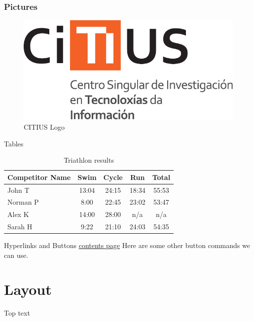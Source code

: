 \documentclass[aspectratio=169]{beamer}
\begin{document}
\begin{frame}
\frametitle{Pictures}
\begin{figure}
\includegraphics[scale=0.5]{img/logo_CiTIUS}
\caption{CITIUS Logo}
\end{figure}
\end{frame}

\begin{frame}{Tables}
\begin{table}
\begin{tabular}{l | c | c | c | c }
Competitor Name & Swim & Cycle & Run & Total \\
\hline \hline
John T & 13:04 & 24:15 & 18:34 & 55:53 \\ 
Norman P & 8:00 & 22:45 & 23:02 & 53:47\\
Alex K & 14:00 & 28:00 & n/a & n/a\\
Sarah H & 9:22 & 21:10 & 24:03 & 54:35 
\end{tabular}
\caption{Triathlon results}
\end{table}
\end{frame}

\begin{frame}{Hyperlinks and Buttons}
\hyperlink{contents}{contents page}
Here are some other button commands we can use.

\hyperlink{columns}{}

\hyperlink{pictures}{}

\hyperlink{pictures}{}
\end{frame}


\section{Layout}
\begin{frame}[t]{Top text}
    \lipsum[66]
\end{frame}
\end{document}
